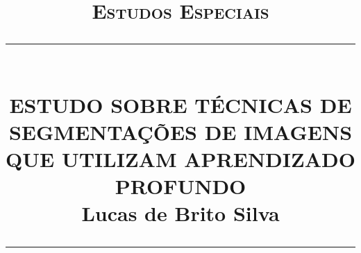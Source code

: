 \newcommand{\HRule}[1]{\rule{\linewidth}{#1}}
\begin{titlepage}
    \title{
        \normalsize  \textsc{Estudos Especiais} \\ [2.0cm]
		\HRule{0.5pt} \\  [0.75cm]
		\LARGE \textbf{\uppercase{ESTUDO SOBRE TÉCNICAS DE SEGMENTAÇÕES DE IMAGENS QUE UTILIZAM APRENDIZADO PROFUNDO}} \\ [1.3cm]
		\large \textbf{Lucas de Brito Silva} \\ [0.5cm]
		\HRule{1.5pt} \\ [0.5cm]
		\normalsize \vspace*{5\baselineskip}
	}

	\date{}

    \maketitle
    \thispagestyle{empty}
\end{titlepage}